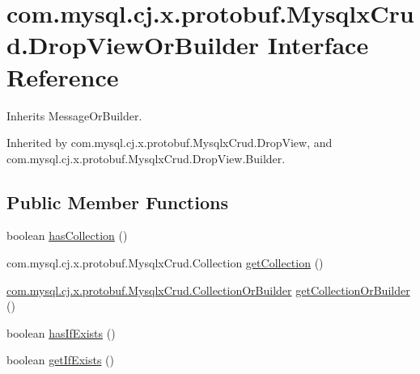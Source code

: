 \hypertarget{interfacecom_1_1mysql_1_1cj_1_1x_1_1protobuf_1_1_mysqlx_crud_1_1_drop_view_or_builder}{}\section{com.\+mysql.\+cj.\+x.\+protobuf.\+Mysqlx\+Crud.\+Drop\+View\+Or\+Builder Interface Reference}
\label{interfacecom_1_1mysql_1_1cj_1_1x_1_1protobuf_1_1_mysqlx_crud_1_1_drop_view_or_builder}


Inherits Message\+Or\+Builder.



Inherited by com.\+mysql.\+cj.\+x.\+protobuf.\+Mysqlx\+Crud.\+Drop\+View, and com.\+mysql.\+cj.\+x.\+protobuf.\+Mysqlx\+Crud.\+Drop\+View.\+Builder.

\subsection*{Public Member Functions}
\begin{DoxyCompactItemize}
\item 
boolean \mbox{\hyperlink{interfacecom_1_1mysql_1_1cj_1_1x_1_1protobuf_1_1_mysqlx_crud_1_1_drop_view_or_builder_acaea487579073770673945fb1be48540}{has\+Collection}} ()
\item 
com.\+mysql.\+cj.\+x.\+protobuf.\+Mysqlx\+Crud.\+Collection \mbox{\hyperlink{interfacecom_1_1mysql_1_1cj_1_1x_1_1protobuf_1_1_mysqlx_crud_1_1_drop_view_or_builder_acd4707a3ea65053dcdbe9c53ec4af87e}{get\+Collection}} ()
\item 
\mbox{\hyperlink{interfacecom_1_1mysql_1_1cj_1_1x_1_1protobuf_1_1_mysqlx_crud_1_1_collection_or_builder}{com.\+mysql.\+cj.\+x.\+protobuf.\+Mysqlx\+Crud.\+Collection\+Or\+Builder}} \mbox{\hyperlink{interfacecom_1_1mysql_1_1cj_1_1x_1_1protobuf_1_1_mysqlx_crud_1_1_drop_view_or_builder_a2d0f5f4ef13e34fcb08d14c37df4288f}{get\+Collection\+Or\+Builder}} ()
\item 
boolean \mbox{\hyperlink{interfacecom_1_1mysql_1_1cj_1_1x_1_1protobuf_1_1_mysqlx_crud_1_1_drop_view_or_builder_a2d703d3283e61d3afc6dc77876eaf561}{has\+If\+Exists}} ()
\item 
boolean \mbox{\hyperlink{interfacecom_1_1mysql_1_1cj_1_1x_1_1protobuf_1_1_mysqlx_crud_1_1_drop_view_or_builder_ab5dc028f34339762c7ba4f13f4ed0c69}{get\+If\+Exists}} ()
\end{DoxyCompactItemize}


